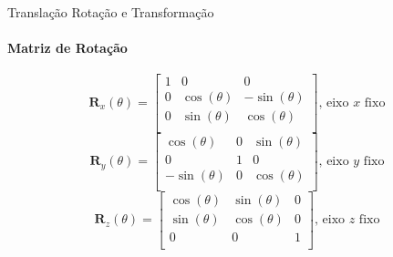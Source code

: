 \documentclass{beamer}
\begin{document}
\begin{frame}{{Translação Rotação e Transformação}}
    \framesubtitle{Matriz de Rotação}
    \begin{block}{}
        \begin{equation*}
            \mathbf{R}_x(\theta) = 
            \begin{bmatrix}
            1 & 0 & 0\\
            0 & \cos(\theta) & -\sin(\theta)\\
            0 & \sin(\theta) & \cos(\theta)\\ 
            \end{bmatrix} \text{, eixo $x$ fixo}
        \end{equation*}
        \begin{equation*}
            \mathbf{R}_y(\theta) = 
            \begin{bmatrix}
            \cos(\theta) & 0 & \sin(\theta) \\
            0 & 1 & 0\\
            -\sin(\theta)  & 0 & \cos(\theta)\\ 
            \end{bmatrix} \text{, eixo $y$ fixo}
        \end{equation*}
        \begin{equation*}
            \mathbf{R}_z(\theta) = 
            \begin{bmatrix}
            \cos(\theta) & \sin(\theta) & 0\\
            \sin(\theta) & \cos(\theta) & 0\\
            0 & 0 & 1\\ 
            \end{bmatrix} \text{, eixo $z$ fixo}
        \end{equation*}
    \end{block}
  
  \end{frame}
\end{document}
